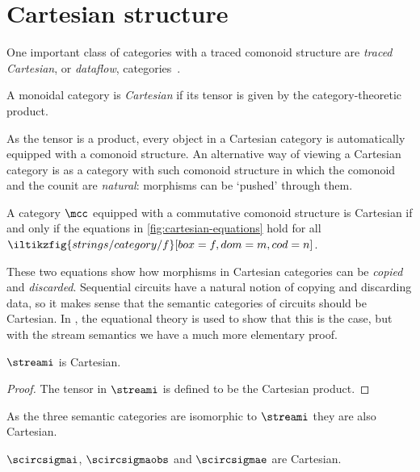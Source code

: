 \section{Cartesian structure}

One important class of categories with a traced comonoid structure are
\emph{traced Cartesian}, or \emph{dataflow},
categories~\cite{cazanescu1990new}.

\begin{definition}
    A monoidal category is \emph{Cartesian} if its tensor is given by the
    category-theoretic product.
\end{definition}

As the tensor is a product, every object in a Cartesian category is
automatically equipped with a comonoid structure.
An alternative way of viewing a Cartesian category is as a category with such
comonoid structure in which the comonoid and the counit are \emph{natural}:
morphisms can be `pushed' through them.

\begin{theorem}
    A category \(\mcc\) equipped with a commutative comonoid structure is
    Cartesian if and only if the equations in \cref{fig:cartesian-equations}
    hold for all \(\iltikzfig{strings/category/f}[box=f,dom=m,cod=n]\).
\end{theorem}

These two equations show how morphisms in Cartesian categories can be
\emph{copied} and \emph{discarded}.
Sequential circuits have a natural notion of copying and discarding data, so it
makes sense that the semantic categories of circuits should be Cartesian.
In \cite{ghica2016categorical}, the equational theory is used to show that this
is the case, but with the stream semantics we have a much more elementary proof.

\begin{theorem}
    \(\streami\) is Cartesian.
\end{theorem}
\begin{proof}
    The tensor in \(\streami\) is defined to be the Cartesian product.
\end{proof}

As the three semantic categories are isomorphic to \(\streami\) they are also
Cartesian.

\begin{corollary}
    \(\scircsigmai\), \(\scircsigmaobs\) and \(\scircsigmae\) are Cartesian.
\end{corollary}

